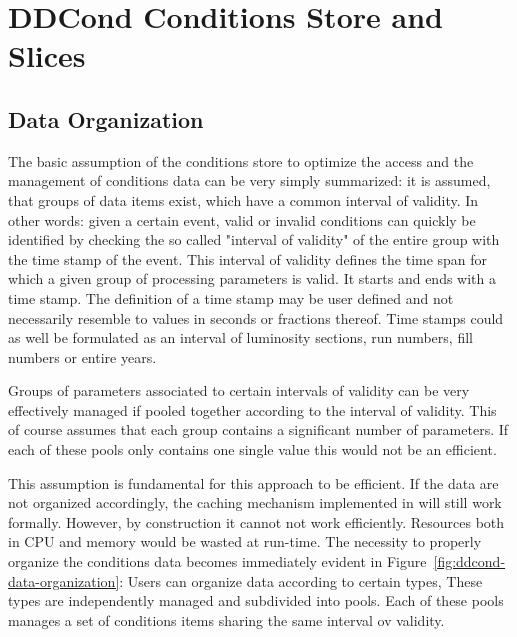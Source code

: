 \documentclass[10pt,a4paper]{article}
\begin{document}
\newpage
\section{DDCond Conditions Store and Slices}
\label{subsec:ddcond-conditions-store}

\subsection{Data Organization}
\label{subsec:ddcond-internal-data-organization}

\noindent
The basic assumption of the \DDC conditions store to optimize the access 
and the management of conditions
data can be very simply summarized: it is assumed, that groups of data items
exist, which have a common interval of validity. In other words: given a 
certain event, valid or invalid conditions can quickly be identified by 
checking the so called "interval of validity" of the entire group with the
time stamp of the event. This interval of validity defines the time span
for which a given group of processing parameters is valid. It starts and 
ends with a time stamp. The definition of a time stamp may be user defined 
and not necessarily resemble to values in seconds or fractions thereof. 
Time stamps could as well be formulated as an interval of luminosity sections,
run numbers, fill numbers or entire years. 

\noindent
Groups of parameters associated to certain intervals of validity can
be very effectively managed if pooled together according to the 
interval of validity. This of course assumes that each group contains
a significant number of parameters. If each of these pools only contains
one single value this would not be an efficient.

\noindent
This assumption is fundamental for this approach to be efficient. 
If the data are not
organized accordingly, the caching mechanism implemented in \DDC will 
still work formally. However, by construction it cannot not work efficiently. 
Resources both in CPU and memory would be wasted at run-time.
The necessity to properly organize the conditions data becomes
immediately evident in Figure~\ref{fig:ddcond-data-organization}:
Users can organize data according to certain types, These types are
independently managed and subdivided into pools. Each of these pools
manages a set of conditions items sharing the same interval ov validity.
\end{document}
